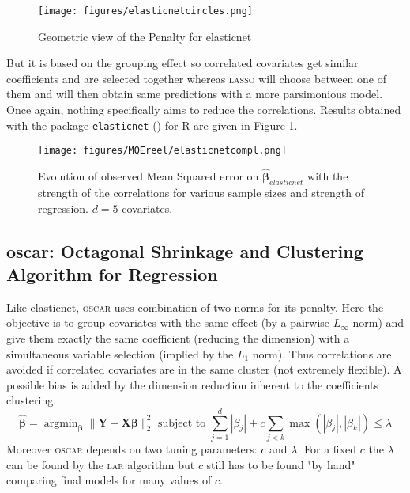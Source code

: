 \documentclass[12pt,a4paper]{report}
\begin{document}
	
	\begin{figure}[h!]
			\centering
			\texttt{[image: figures/elasticnetcircles.png]} 
			\caption{Geometric view of the Penalty for elasticnet}
		\end{figure}	
	
	But it is based on the grouping effect so correlated covariates get similar coefficients and are selected together whereas \textsc{lasso} will choose between one of them and will then obtain same predictions with a more parsimonious model. Once again, nothing specifically aims to reduce the correlations. Results obtained with the package {\tt elasticnet} (\cite{packageelasticnet}) for R are given in Figure \ref{MQEelasticnetcompl}.

	
	 \begin{figure}
	 \centering
	  \texttt{[image: figures/MQEreel/elasticnetcompl.png]}
	  \caption{Evolution of observed Mean Squared error on $\hat{\boldsymbol{\beta}}_{elasticnet}$ with the strength of the correlations for various sample sizes and strength of regression. $d=5$ covariates. } \label{MQEelasticnetcompl}
	\end{figure}
		
		 \FloatBarrier

		\subsection{{\sc oscar}: Octagonal Shrinkage and Clustering Algorithm for Regression }		%

			Like elasticnet, \textsc{oscar} \cite{bondell2008simultaneous} uses combination of two norms for its penalty. Here the objective is to group covariates with the same effect (by a pairwise $L_\infty$ norm) and give them exactly the same coefficient (reducing the dimension) with a simultaneous variable selection (implied by the $L_1$ norm). Thus correlations are avoided if correlated covariates are in the same cluster (not extremely flexible). A possible bias is added by the dimension reduction inherent to the coefficients clustering.
			\begin{equation}
				\hat{\boldsymbol{\beta}}=\operatorname{argmin}_{\boldsymbol{\beta}} \parallel\boldsymbol{Y}-\boldsymbol{X}\boldsymbol{\beta} \parallel^2_2 \textrm{ subject to } \sum_{j=1}^d|\beta_j|+c\sum_{j<k}\operatorname{max}(|\beta_j|,|\beta_k|) \leq \lambda		 \nonumber 
			\end{equation}						
			Moreover \textsc{oscar} depends on two tuning parameters: $c$ and $\lambda$. For a fixed $c$ the $\lambda$ can be found by the \textsc{lar} algorithm but $c$ still has to be found "by hand" comparing final models for many values of $c$.
			
\end{document}
